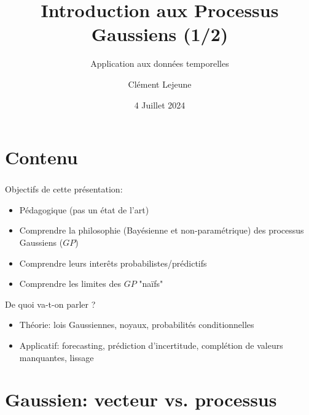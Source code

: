 \documentclass[xcolor=svgnames, t]{beamer}
\title[Introduction aux Processus Gaussiens]{Introduction aux Processus Gaussiens (1/2)}
\subtitle{Application aux données temporelles}
\author[Cl\'ement Lejeune]{Cl\'ement Lejeune}
\institute[TSN/DIL/AD3/IA]{
Thales,
\\ TSN/DIL/AD3/IA
}
\date{4 Juillet 2024}
\begin{document}
\frame{\titlepage}

\section{Contenu}
\begin{frame}\frametitle{\secname}
  Objectifs de cette présentation:
  \begin{itemize}
    \item Pédagogique (pas un état de l'art)
    \pause
    \item Comprendre la philosophie (Bayésienne et non-paramétrique) des processus Gaussiens ($GP$)
    \pause
    \item Comprendre leurs interêts probabilistes/prédictifs
    \pause
    \item Comprendre les limites des $GP$ "naïfs"
  \end{itemize}
  De quoi va-t-on parler ?
  \begin{itemize}
    \item Théorie: lois Gaussiennes, noyaux, probabilités conditionnelles
    \pause
    \item Applicatif: forecasting, prédiction d'incertitude, complétion de valeurs manquantes, lissage
  \end{itemize}
\end{frame}

\AtBeginSubsection[]
{
  \begin{frame}\frametitle{\secname}
    \tableofcontents[currentsubsection]
  \end{frame}
}

\section{Gaussien: vecteur vs. processus}
\end{document}
